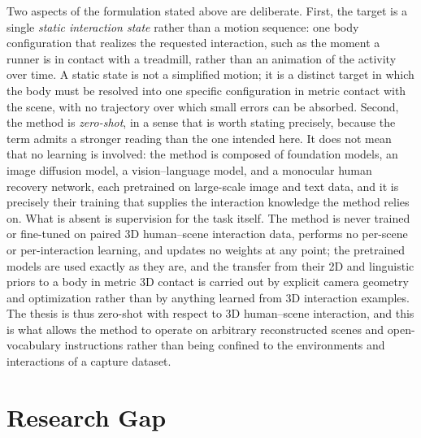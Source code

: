 Two aspects of the formulation stated above are deliberate. First, the target is a single \emph{static interaction state} rather than a motion sequence: one body configuration that realizes the requested interaction, such as the moment a runner is in contact with a treadmill, rather than an animation of the activity over time. A static state is not a simplified motion; it is a distinct target in which the body must be resolved into one specific configuration in metric contact with the scene, with no trajectory over which small errors can be absorbed. Second, the method is \emph{zero-shot}, in a sense that is worth stating precisely, because the term admits a stronger reading than the one intended here. It does not mean that no learning is involved: the method is composed of foundation models, an image diffusion model, a vision--language model, and a monocular human recovery network, each pretrained on large-scale image and text data, and it is precisely their training that supplies the interaction knowledge the method relies on. What is absent is supervision for the task itself. The method is never trained or fine-tuned on paired 3D human--scene interaction data, performs no per-scene or per-interaction learning, and updates no weights at any point; the pretrained models are used exactly as they are, and the transfer from their 2D and linguistic priors to a body in metric 3D contact is carried out by explicit camera geometry and optimization rather than by anything learned from 3D interaction examples. The thesis is thus zero-shot with respect to 3D human--scene interaction, and this is what allows the method to operate on arbitrary reconstructed scenes and open-vocabulary instructions rather than being confined to the environments and interactions of a capture dataset.

\section{Research Gap}
\label{sec:intro-gap}

